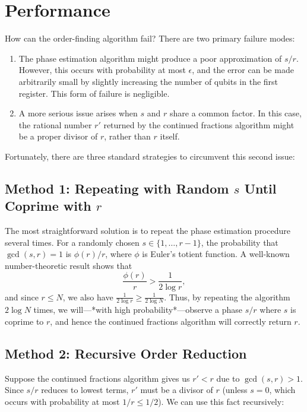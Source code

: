 \section{Performance}

How can the order-finding algorithm fail? There are two primary failure modes:

\begin{enumerate}
    \item The phase estimation algorithm might produce a poor approximation of $s/r$. However, this occurs with probability at most $\epsilon$, and the error can be made arbitrarily small by slightly increasing the number of qubits in the first register. This form of failure is negligible.

    \item A more serious issue arises when $s$ and $r$ share a common factor. In this case, the rational number $r'$ returned by the continued fractions algorithm might be a proper divisor of $r$, rather than $r$ itself.
\end{enumerate}

Fortunately, there are three standard strategies to circumvent this second issue:

\subsection{Method 1: Repeating with Random $s$ Until Coprime with $r$}

The most straightforward solution is to repeat the phase estimation procedure several times. For a randomly chosen $s \in \{1, \ldots, r-1\}$, the probability that $\gcd(s, r) = 1$ is $\phi(r)/r$, where $\phi$ is Euler's totient function. A well-known number-theoretic result shows that
\[
\frac{\phi(r)}{r} > \frac{1}{2 \log r},
\]
and since $r \leq N$, we also have $\frac{1}{2\log r} \geq \frac{1}{2 \log N}$. Thus, by repeating the algorithm $2 \log N$ times, we will—*with high probability*—observe a phase $s/r$ where $s$ is coprime to $r$, and hence the continued fractions algorithm will correctly return $r$.

\subsection{Method 2: Recursive Order Reduction}

Suppose the continued fractions algorithm gives us $r' < r$ due to $\gcd(s, r) > 1$. Since $s/r$ reduces to lowest terms, $r'$ must be a divisor of $r$ (unless $s = 0$, which occurs with probability at most $1/r \leq 1/2$). We can use this fact recursively:

